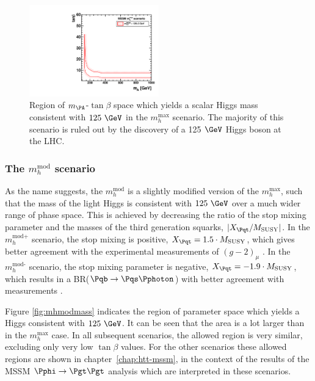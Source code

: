 \begin{figure}[htbp]
   \includegraphics[width=0.5\textwidth]{plots/theory/cmb_mhmax-HypoTest.pdf}
\caption{Region of $m_{\PA}$-$\tan\beta$ space which yields a scalar Higgs mass 
consistent with $125~\GeV$ in the $m_{h}^{\text{max}}$ scenario. The majority of
this scenario is ruled out by the discovery of a 125$~\GeV$ Higgs boson at the
LHC.}
\label{fig:mhmaxmass}
\end{figure}

\subsubsection{The $m_{h}^{\text{mod}}$ scenario}
\label{sec:mhmodscenario}

As the name suggests, the $m_{h}^{\text{mod}}$ is a slightly modified version of
the $m_{h}^{\text{max}}$, such that the mass of the light Higgs is consistent
with $125~\GeV$ over a much wider range of phase space. This is achieved by
decreasing the ratio of the stop mixing parameter and the masses of the third
generation squarks, $|X_{\Pqt}/M_{\text{SUSY}}|$. In the $m_{h}^{\text{mod+}}$
scenario, the stop mixing is positive, $X_{\Pqt} = 1.5 \cdot M_{\text{SUSY}}$,
which gives better agreement with the experimental measurements of $(g-2)_{\mu}$
\cite{Miller:2007kk}. In the $m_{h}^{\text{mod-}}$ scenario, the stop mixing parameter is
negative, $X_{\Pqt} = -1.9 \cdot M_{\text{SUSY}}$, which results in a
BR($\Pqb\to\Pqs\Pphoton$) with better agreement with measurements
\cite{Lees:2012wg}.

Figure \ref{fig:mhmodmass} indicates the region of parameter space which yields
a Higgs consistent with $125~\GeV$. It can be seen that the area is a lot larger
than in the $m_{h}^{\text{max}}$ case. In all subsequent scenarios, the allowed
region is very similar, excluding only very low $\tan\beta$ values. For the
other scenarios these allowed regions are shown in chapter~\ref{chap:htt-mssm},
in the context of the results of the MSSM $\Pphi \to \Pgt\Pgt$ analysis which
are interpreted in these scenarios.

